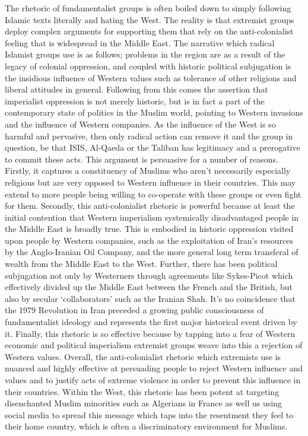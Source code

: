 \documentclass[10pt,a4paper]{article}
\newcounter{count}
\begin{document}
\begin{multicols}{2}
The rhetoric of fundamentalist groups is often boiled down to simply following Islamic texts literally and hating the West. The reality is that extremist groups deploy complex arguments for supporting them that rely on the anti-colonialist feeling that is widespread in the Middle East. The narrative which radical Islamist groups use is as follows; problems in the region are as a result of the legacy of colonial oppression, and coupled with historic political subjugation is the insidious influence of Western values such as tolerance of other religions and liberal attitudes in general. Following from this comes the assertion that imperialist oppression is not merely historic, but is in fact a part of the contemporary state of politics in the Muslim world, pointing to Western invasions and the influence of Western companies. As the influence of the West is so harmful and pervasive, then only radical action can remove it and the group in question, be that ISIS, Al-Qaeda or the Taliban has legitimacy and a prerogative to commit these acts. This argument is persuasive for a number of reasons. Firstly, it captures a constituency of Muslims who aren’t necessarily especially religious but are very opposed to Western influence in their countries. This may extend to more people being willing to co-operate with these groups or even fight for them. Secondly, this anti-colonialist rhetoric is powerful because at least the initial contention that Western imperialism systemically disadvantaged people in the Middle East is broadly true. This is embodied in historic oppression visited upon people by Western companies, such as the exploitation of Iran’s resources by the Anglo-Iranian Oil Company, and the more general long term transferal of wealth from the Middle East to the West. Further, there has been political subjugation not only by Westerners through agreements like Sykes-Picot which effectively divided up the Middle East between the French and the British, but also by secular ‘collaborators’ such as the Iranian Shah. It’s no coincidence that the 1979 Revolution in Iran preceded a growing public consciousness of fundamentalist ideology and represents the first major historical event driven by it. Finally, this rhetoric is so effective because by tapping into a fear of Western economic and political imperialism extremist groups weave into this a rejection of Western values. Overall, the anti-colonialist rhetoric which extremists use is nuanced and highly effective at persuading people to reject Western influence and values and to justify acts of extreme violence in order to prevent this influence in their countries. Within the West, this rhetoric has been potent at targeting disenchanted Muslim minorities such as Algerians in France as well us using social media to spread this message which taps into the resentment they feel to their home country, which is often a discriminatory environment for Muslims.


\end{multicols}
\end{document}

